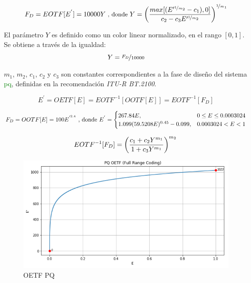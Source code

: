 \documentclass[a4paper, 12pt]{report}
\begin{document}
\footnotesize
\begin{equation} \label{eq:eotf_pq}
    F_D = EOTF[E^{'}] = 10000Y \\
    {\small \textrm{  , donde  }}\\ 
    Y= \left ( \frac{max[(E'^{\nicefrac{1}{m_2}} - c_1),0]}{c_2 -c_3E'^{\nicefrac{1}{m_2}}} \right)^{\nicefrac{1}{m_1}}
\end{equation}

\normalsize
\begin{itemize}
    \item {\small El parámetro $Y$ es definido como un color linear normalizado, en el rango $[0, 1]$. Se obtiene a través de la igualdad: {\footnotesize $$Y=\nicefrac{F_D}{10000}$$}}
    {\small \item $m_1$, $m_2$, $c_1$, $c_2$ y $c_3$  son constantes correspondientes a la fase de diseño del sistema \textcolor{green}{pq}, definidas en la recomendación \textit{ITU-R BT.2100}.}
\end{itemize}

\footnotesize
\begin{equation} \label{eq:oetf_pq}
    E^{'} = OETF[E] = EOTF^{-1}[OOTF[E]] = EOTF^{-1}[F_D]
\end{equation}

\begin{equation}  \label{eq:ootf_pq}
   F_D = OOTF[E] = 100E^{'^{2.4}} \textrm{  , donde  }\\
       E^{'}=%
        \begin{cases}
            267.84E, & 0\leq E \leq 0.0003024\\
            1.099(59.5208E)^{0.45} - 0.099, &0.0003024 < E < 1
        \end{cases}
\end{equation}

\begin{equation} \label{eq:inv_eotf_pq}
    EOTF^{-1}[F_D] = \left ( \frac{c_1 + c_2Y^{m_1}}{1 + c_3Y^{m_1}} \right)^{m_2}\\
\end{equation}

\normalsize
\begin{figure}[H]
  \centering
  \includegraphics[width=12cm, keepaspectratio]{img/4_Formatos_de_TV_HDR/4_1_Sistema_PQ/2_oetf_full_range_log_lin.png}
  \caption{OETF PQ}
  \label{fig:pq_graph_oetf}
\end{figure}
\end{document}
